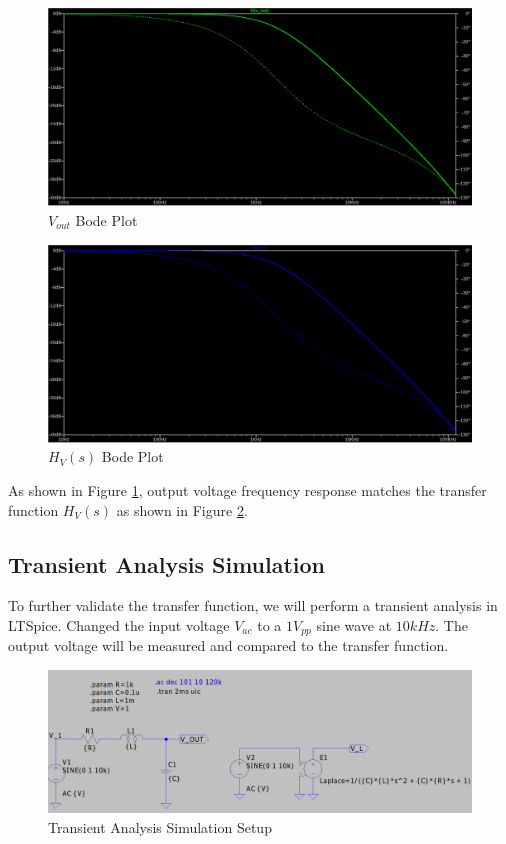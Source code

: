 \begin{figure}[h]
    \centering
    \includegraphics[width=1\textwidth]{assets/rlc-v-out.png}
    \caption{$V_{out}$ Bode Plot}
    \label{fig:rlc_v_out_bode_plot}
\end{figure}
\begin{figure}[h]
    \centering
    \includegraphics[width=1\textwidth]{assets/rlc-v-l.png}
    \caption{$H_{V}(s)$ Bode Plot}
    \label{fig:rlc_v_laplace_bode_plot}
\end{figure}

As shown in Figure \ref{fig:rlc_v_out_bode_plot}, output voltage frequency response matches the transfer function $H_{V}(s)$ as shown in Figure \ref{fig:rlc_v_laplace_bode_plot}.

\newpage
\thispagestyle{plain}

\subsection{Transient Analysis Simulation}
To further validate the transfer function, we will perform a transient analysis in LTSpice. Changed the input voltage $V_{ac}$ to a $1V_{pp}$ sine wave at $10kHz$. The output voltage will be measured and compared to the transfer function.

\begin{figure}[h]
    \centering
    \includegraphics[width=1\textwidth, height=0.4\textheight]{assets/rlc-transient-sim.png}
    \caption{Transient Analysis Simulation Setup}
    \label{fig:transient_analysis}
\end{figure}

